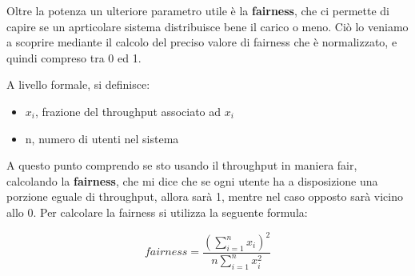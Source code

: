 Oltre la potenza un ulteriore parametro utile è la \textbf{fairness}, che ci permette di capire se un aprticolare sistema distribuisce bene il carico o meno. Ciò lo veniamo a scoprire mediante il calcolo del preciso valore di fairness che è normalizzato, e quindi compreso tra 0 ed 1.

A livello formale, si definisce:

\begin{itemize}
    \item \(x_i\), frazione del throughput associato ad \(x_i\)
    \item n, numero di utenti nel sistema
\end{itemize}

A questo punto comprendo se sto usando il throughput in maniera fair, calcolando la \textbf{fairness}, che mi dice che se ogni utente ha a disposizione una porzione eguale di throughput, allora sarà 1, mentre nel caso opposto sarà vicino allo 0.
Per calcolare la fairness si utilizza la seguente formula:

\[
fairness = \frac{\left(\sum_{i=1}^{n}x_i\right)^2}{n\sum_{i=1}^{n}x_i^2}
\]

